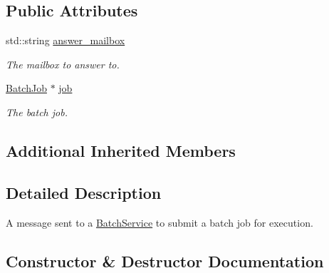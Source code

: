 \subsection*{Public Attributes}
\begin{DoxyCompactItemize}
\item 
\mbox{\label{classwrench_1_1_batch_service_job_request_message_acf4e18e89cd2419af5f5de0f08a32254}} 
std\+::string \hyperlink{classwrench_1_1_batch_service_job_request_message_acf4e18e89cd2419af5f5de0f08a32254}{answer\+\_\+mailbox}
\begin{DoxyCompactList}\small\item\em The mailbox to answer to. \end{DoxyCompactList}\item 
\mbox{\label{classwrench_1_1_batch_service_job_request_message_ab1279040739326a80418e60cf6b80b05}} 
\hyperlink{classwrench_1_1_batch_job}{Batch\+Job} $\ast$ \hyperlink{classwrench_1_1_batch_service_job_request_message_ab1279040739326a80418e60cf6b80b05}{job}
\begin{DoxyCompactList}\small\item\em The batch job. \end{DoxyCompactList}\end{DoxyCompactItemize}
\subsection*{Additional Inherited Members}


\subsection{Detailed Description}
A message sent to a \hyperlink{classwrench_1_1_batch_service}{Batch\+Service} to submit a batch job for execution. 

\subsection{Constructor \& Destructor Documentation}
\mbox{\label{classwrench_1_1_batch_service_job_request_message_a563be67cfe2b719c47ab3c54850b523e}} 
